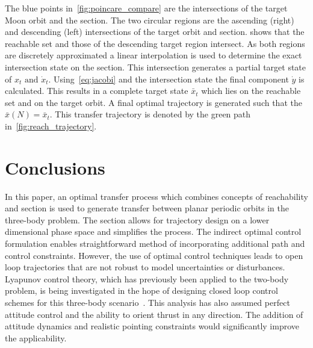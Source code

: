 \documentclass[letterpaper, paper,11pt]{AAS}		%
\begin{document}
The blue points in~\cref{fig:poincare_compare} are the intersections of the target Moon orbit and the \Poincare section.
The two circular regions are the ascending (right) and descending (left) intersections of the target orbit and \Poincare section.
 shows that the reachable set and those of the descending target region intersect.
As both regions are discretely approximated a linear interpolation is used to determine the exact intersection state on the \Poincare section.
This intersection generates a partial target state of \( x_t \text{ and } \dot{x}_t \).
Using~\cref{eq:jacobi} and the intersection state the final component \( \dot{y} \) is calculated. 
This results in a complete target state \( \bar{x}_t \) which lies on the reachable set and on the target orbit. 
A final optimal trajectory is generated such that the \( \bar{x}(N) = \bar{x}_t \).
This transfer trajectory is denoted by the green path in~\cref{fig:reach_trajectory}.


%
%
%
%
\section{Conclusions}\label{sec:conclusion}
In this paper, an optimal transfer process which combines concepts of reachability and \Poincare section is used to generate transfer between planar periodic orbits in the three-body problem.
The \Poincare section allows for trajectory design on a lower dimensional phase space and simplifies the process.
The indirect optimal control formulation enables straightforward method of incorporating additional path and control constraints.
However, the use of optimal control techniques leads to open loop trajectories that are not robust to model uncertainties or disturbances.
Lyapunov control theory, which has previously been applied to the two-body problem, is being investigated in the hope of designing closed loop control schemes for this three-body scenario~\cite{chang2002}.
This analysis has also assumed perfect attitude control and the ability to orient thrust in any direction.
The addition of attitude dynamics and realistic pointing constraints would significantly improve the applicability.


\end{document}
